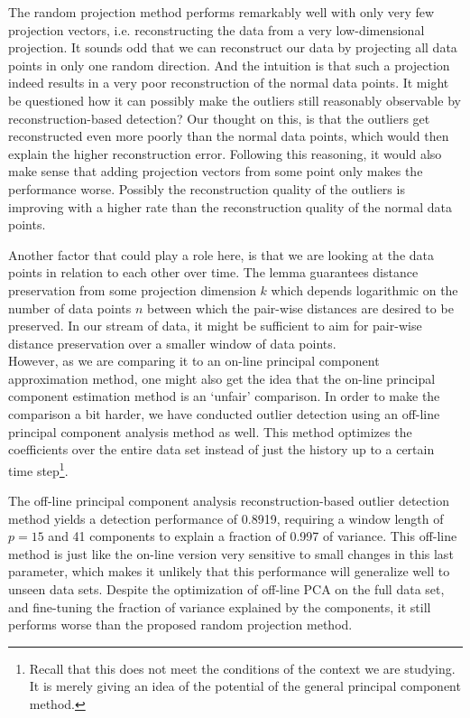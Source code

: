 The random projection method performs remarkably well with only very few projection vectors, i.e. reconstructing the data from a very low-dimensional projection. It sounds odd that we can reconstruct our data by projecting all data points in only one random direction. And the intuition is that such a projection indeed results in a very poor reconstruction of the normal data points. 
It might be questioned how it can possibly make the outliers still reasonably observable by reconstruction-based detection? Our thought on this, is that the outliers get reconstructed even more poorly than the normal data points, which would then explain the higher reconstruction error. 
Following this reasoning, it would also make sense that adding projection vectors from some point only makes the performance worse. Possibly the reconstruction quality of the outliers is improving with a higher rate than the reconstruction quality of the normal data points. 

Another factor that could play a role here, is that we are looking at the data points in relation to each other over time. The lemma guarantees distance preservation from some projection dimension $k$ which depends logarithmic on the number of data points $n$ between which the pair-wise distances are desired to be preserved. In our stream of data, it might be sufficient to aim for pair-wise distance preservation over a smaller window of data points.\\


However, as we are comparing it to an on-line principal component approximation method, one might also get the idea that the on-line principal component estimation method is an `unfair' comparison. In order to make the comparison a bit harder, we have conducted outlier detection using an off-line principal component analysis method as well. This method optimizes the coefficients over the entire data set instead of just the history up to a certain time step\footnote{Recall that this does not meet the conditions of the context we are studying. It is merely giving an idea of the potential of the general principal component method.}. 

The off-line principal component analysis reconstruction-based outlier detection method yields a detection performance of 0.8919, requiring a window length of $p=15$ and 41 components to explain a fraction of 0.997 of variance. This off-line method is just like the on-line version very sensitive to small changes in this last parameter, which makes it unlikely that this performance will generalize well to unseen data sets. Despite the optimization of off-line PCA on the full data set, and fine-tuning the fraction of variance explained by the components, it still performs worse than the proposed random projection method. 


